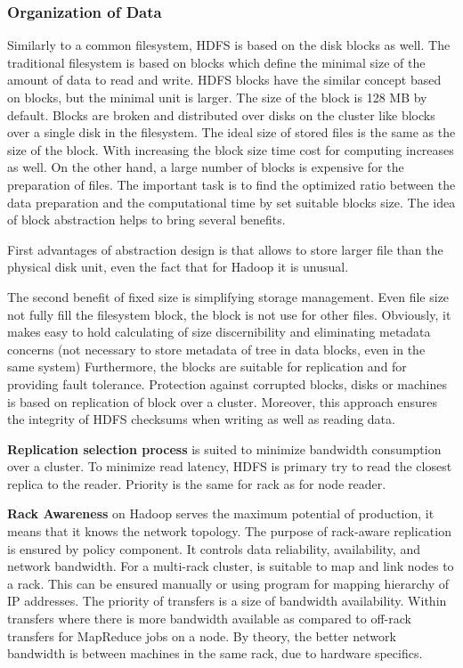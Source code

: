 \documentclass[a4paper,12pt,oneside]{report}
\begin{document}
	\subsubsection{Organization of Data}
	Similarly to  a common filesystem, HDFS is based on the disk blocks as well. The
	traditional
	filesystem is based on blocks which define the minimal size of the amount of
	data to read and write.
	HDFS blocks have the similar concept based on blocks, but the minimal unit is
	larger. The size of the block is 128 MB by default. Blocks are broken and
	distributed
	over disks on the cluster like blocks over a single disk in the filesystem. The
	ideal 
	size of stored files is the same as the size of the block. With increasing the
	block 
	size time cost for computing increases as well. On the other hand, a large
	number
	of blocks is expensive for the preparation of files. The important task is to
	find the optimized 
	ratio between the data preparation and the computational time by set suitable
	blocks size.
	The idea of block abstraction helps to bring several benefits.
	
	First advantages of
	abstraction design is that allows to store larger file than the physical disk
	unit, 
	even the fact that for Hadoop it is unusual.
	
	The second benefit of fixed size is simplifying storage management. Even file
	size not fully fill the filesystem block, the block is not use for other files. 
	Obviously, it makes easy 
	to hold calculating of size discernibility and eliminating metadata concerns
	(not necessary 
	to store metadata of tree in data blocks, even in the same system)
	Furthermore, the blocks are suitable for replication and for providing fault
	tolerance. Protection
	against corrupted blocks, disks or machines is based on replication of block
	over a cluster. 
	Moreover, this approach ensures the integrity of HDFS checksums when writing as
	well as reading data.
	
	\textbf{Replication selection process} is suited to minimize bandwidth
	consumption over a cluster. 
	To minimize read latency, HDFS is primary try to read the closest replica to the
	reader. Priority is the 
	same for rack as for node reader. \cite{hadoop_hdfs_web}
	
	\textbf{Rack Awareness} on Hadoop serves the maximum potential of production, 
	it means that it knows the network topology. The purpose of rack-aware
	replication is ensured by policy 
	component. It controls data reliability, availability, and network bandwidth.
	For a multi-rack cluster, is suitable to map and link
	nodes to a rack\cite{hadoop_rack_web}. This can be ensured manually or using
	program for mapping hierarchy of IP 
	addresses. The priority of transfers is a size of bandwidth availability. Within
	transfers 
	where there is more bandwidth available as compared to off-rack transfers for
	MapReduce jobs on a node. 
	By theory, the better network bandwidth is between machines in the same rack,
	due to hardware specifics.
	
\end{document}

